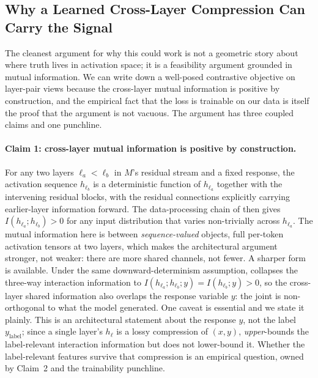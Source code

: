 \subsection{Why a Learned Cross-Layer Compression Can Carry the Signal}
\label{subsec:hd:argument}

The cleanest argument for why this could work is not a geometric story about
where truth lives in activation space; it is a feasibility argument grounded in
mutual information. We can write down a well-posed contrastive objective on
layer-pair views because the cross-layer mutual information is positive by
construction, and the empirical fact that the loss is trainable on our data is
itself the proof that the argument is not vacuous. The argument has three coupled
claims and one punchline.

\paragraph{Claim 1: cross-layer mutual information is positive by construction.}
For any two layers $\ell_a < \ell_b$ in $M$'s residual stream and a fixed
response, the activation sequence $h_{\ell_b}$ is a deterministic function of
$h_{\ell_a}$ together with the intervening residual blocks, with the residual
connections explicitly carrying earlier-layer information forward. The
data-processing chain of  then gives
$I(h_{\ell_a}; h_{\ell_b}) > 0$ for any input distribution that varies
non-trivially across $h_{\ell_a}$. The mutual information here is between
\emph{sequence-valued} objects, full per-token activation tensors at two
layers, which makes the architectural argument stronger, not weaker: there are
more shared channels, not fewer. A sharper form is available. Under the same
downward-determinism assumption,  collapses the three-way
interaction information to
$I(h_{\ell_a}; h_{\ell_b}; y) = I(h_{\ell_b}; y) > 0$, so the cross-layer shared
information also overlaps the response variable $y$: the joint is non-orthogonal
to what the model generated. One caveat is essential and we state it plainly.
This is an architectural statement about the response $y$, not the label
$y_{\mathrm{label}}$; since a single layer's $h_\ell$ is a lossy compression of
$(x,y)$,  \emph{upper}-bounds the label-relevant interaction
information but does not lower-bound it. Whether the label-relevant features
survive that compression is an empirical question, owned by Claim~2 and the
trainability punchline.

